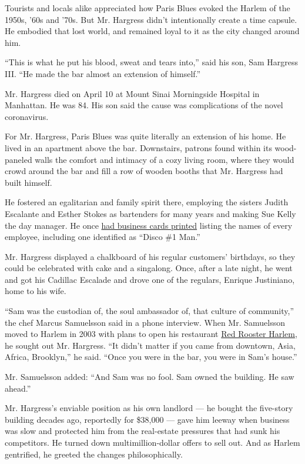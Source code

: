 Tourists and locals alike appreciated how Paris Blues evoked the Harlem
of the 1950s, '60s and '70s. But Mr. Hargress didn't intentionally
create a time capsule. He embodied that lost world, and remained loyal
to it as the city changed around him.

``This is what he put his blood, sweat and tears into,'' said his son,
Sam Hargress III. ``He made the bar almost an extension of himself.''

Mr. Hargress died on April 10 at Mount Sinai Morningside Hospital in
Manhattan. He was 84. His son said the cause was complications of the
novel coronavirus.

For Mr. Hargress, Paris Blues was quite literally an extension of his
home. He lived in an apartment above the bar. Downstairs, patrons found
within its wood-paneled walls the comfort and intimacy of a cozy living
room, where they would crowd around the bar and fill a row of wooden
booths that Mr. Hargress had built himself.

He fostered an egalitarian and family spirit there, employing the
sisters Judith Escalante and Esther Stokes as bartenders for many years
and making Sue Kelly the day manager. He once
\href{https://archive.nytimes3xbfgragh.onion/query.nytimes3xbfgragh.onion/gst/fullpage-9A0CEFDB173CF932A05756C0A9669D8B63.html}{had
business cards printed} listing the names of every employee, including
one identified as ``Disco \#1 Man.''

Mr. Hargress displayed a chalkboard of his regular customers' birthdays,
so they could be celebrated with cake and a singalong. Once, after a
late night, he went and got his Cadillac Escalade and drove one of the
regulars, Enrique Justiniano, home to his wife.

``Sam was the custodian of, the soul ambassador of, that culture of
community,'' the chef Marcus Samuelsson said in a phone interview. When
Mr. Samuelsson moved to Harlem in 2003 with plans to open his restaurant
\href{https://www.nytimes3xbfgragh.onion/2011/03/09/dining/reviews/09rest.html}{Red
Rooster Harlem}, he sought out Mr. Hargress. ``It didn't matter if you
came from downtown, Asia, Africa, Brooklyn,'' he said. ``Once you were
in the bar, you were in Sam's house.''

Mr. Samuelsson added: ``And Sam was no fool. Sam owned the building. He
saw ahead.''

Mr. Hargress's enviable position as his own landlord --- he bought the
five-story building decades ago, reportedly for \$38,000 --- gave him
leeway when business was slow and protected him from the real-estate
pressures that had sunk his competitors. He turned down
multimillion-dollar offers to sell out. And as Harlem gentrified, he
greeted the changes philosophically.

